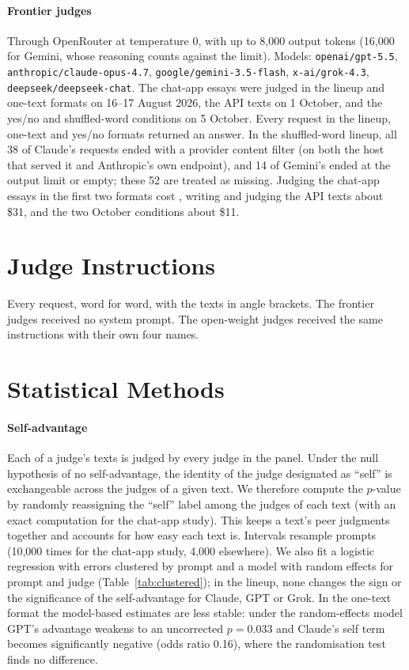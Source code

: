 \paragraph{Frontier judges} Through OpenRouter at temperature 0, with up to
8,000 output tokens (16,000 for Gemini, whose reasoning counts against the
limit). Models: \nolinkurl{openai/gpt-5.5}, \nolinkurl{anthropic/claude-opus-4.7},
\nolinkurl{google/gemini-3.5-flash}, \nolinkurl{x-ai/grok-4.3},
\nolinkurl{deepseek/deepseek-chat}. The chat-app essays were judged in the lineup
and one-text formats on 16--17 August 2026, the API texts on 1 October, and
the yes/no and shuffled-word conditions on 5 October. Every request in the
lineup, one-text and yes/no formats returned an answer. In the shuffled-word
lineup, all 38 of Claude's requests ended with a provider content filter (on
both the host that served it and Anthropic's own endpoint), and 14 of
Gemini's ended at the output limit or empty; these 52 are treated as missing.
Judging the chat-app essays in the first two formats cost \CostStudyOne{},
writing and judging the API texts about \$31, and the two October conditions
about \$11.

\FloatBarrier
\section{Judge Instructions}
\label{app:instructions}

Every request, word for word, with the texts in angle brackets. The frontier
judges received no system prompt. The open-weight judges received the same
instructions with their own four names.



\FloatBarrier
\section{Statistical Methods}
\label{app:stats}

\paragraph{Self-advantage} Each of a judge's texts is judged by every judge
in the panel. Under the null hypothesis of no self-advantage, the identity of
the judge designated as ``self'' is exchangeable across the judges of a given
text. We therefore
compute the $p$-value by randomly reassigning the ``self'' label among the
judges of each text (with an exact computation for the chat-app study). This keeps a text's
peer judgments together and accounts for how easy each text is. Intervals
resample prompts (10,000 times for the chat-app study, 4,000 elsewhere). We
also fit a logistic regression with errors clustered by prompt and a model
with random effects for prompt and judge (Table~\ref{tab:clustered}); in the
lineup, none changes the sign or the significance of the self-advantage for
Claude, GPT or Grok. In the one-text format the model-based estimates are less
stable: under the random-effects model GPT's advantage weakens to an
uncorrected $p=0.033$ and Claude's self term becomes significantly negative
(odds ratio 0.16), where the randomisation test finds no difference.


